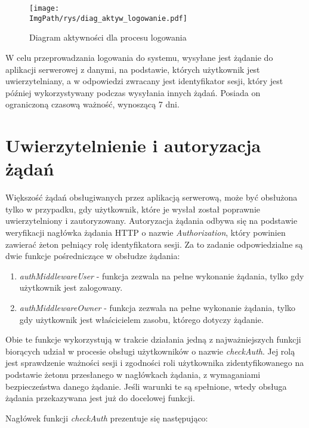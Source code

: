 \documentclass[a4paper,12pt,twoside,openany]{report}
\newcommand{\ImgPath}{.}
\begin{document}
\begin{figure}[!htbp]
	\begin{center}
		\centering
		\texttt{[image: \\ImgPath/rys/diag\_aktyw\_logowanie.pdf]}
	\end{center}
	\caption{Diagram aktywności dla procesu logowania}
	\label{diagramAktywnosciLogowanie}
\end{figure}
\newpage
W celu przeprowadzania logowania do systemu, wysyłane jest żądanie do aplikacji serwerowej z danymi, na podstawie, których użytkownik jest uwierzytelniany, a w odpowiedzi zwracany jest identyfikator sesji, który jest później wykorzystywany podczas wysyłania innych żądań. Posiada on ograniczoną czasową ważność, wynoszącą 7 dni.



\section{Uwierzytelnienie i autoryzacja żądań}
Większość żądań obsługiwanych przez aplikacją serwerową, może być obsłużona tylko w przypadku, gdy użytkownik, które je wysłał został poprawnie uwierzytelniony i zautoryzowany. 
Autoryzacja żądania odbywa się na podstawie weryfikacji nagłówka żądania HTTP o nazwie \textit{Authorization}, który powinien zawierać żeton pełniący rolę identyfikatora sesji. Za to zadanie odpowiedzialne są dwie funkcje pośredniczące w obsłudze żądania: 
\begin{enumerate}
	
	\item \textit{authMiddlewareUser} - funkcja zezwala na pełne wykonanie żądania, tylko gdy użytkownik jest zalogowany.
	
	\item \textit{authMiddlewareOwner} - funkcja zezwala na pełne wykonanie żądania, tylko gdy użytkownik jest właścicielem zasobu, którego dotyczy żądanie.
	
\end{enumerate}

Obie te funkcje wykorzystują w trakcie działania jedną z najważniejszych funkcji biorących udział w procesie obsługi użytkowników o nazwie \textit{checkAuth}. Jej rolą jest sprawdzenie ważności sesji i zgodności roli użytkownika zidentyfikowanego na podstawie żetonu przesłanego w nagłówkach żądania, z wymaganiami bezpieczeństwa danego żądanie. Jeśli warunki te są spełnione, wtedy obsługa żądania przekazywana jest już do docelowej funkcji. 

Nagłówek funkcji \textit{checkAuth} prezentuje się następująco:
\end{document}
